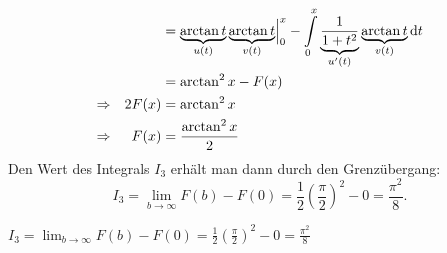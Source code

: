 {\begin{itemize}
\begin{align*}
&&&= \Bigl.\underbrace{\arctan t}_{u(t)} \underbrace{\arctan t}_{v(t)}\Bigr|_{0}^x - \int\limits_0^x \underbrace{\frac 1 {1+t^2}}_{u'(t)} \underbrace{\arctan t}_{v(t)}\mathrm{d} t\\
&&&= \arctan^2 x - F(x)\\
\Rightarrow && 2F(x)&= \arctan^2 x\\
\Rightarrow && F(x)&= \frac{\arctan^2 x}2
\end{align*}
Den Wert des Integrals $I_3$ erh\"alt man dann durch den Grenz\"ubergang: 
$$I_3= \lim_{b\to \infty} F(b)-F(0) = \frac 12 \left( \frac \pi 2\right)^2 - 0 = \frac{\pi^2}8.$$
\end{itemize}
}

{
$I_3= \lim_{b\to \infty} F(b)-F(0) = \frac 12 \left( \frac \pi 2\right)^2 - 0 = \frac{\pi^2}8$
}

